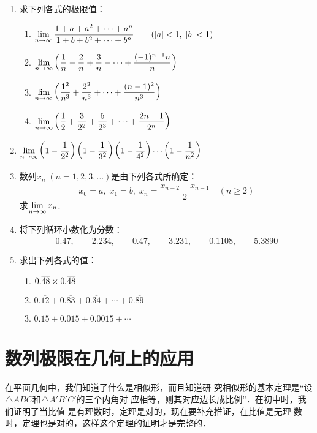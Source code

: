 \begin{enumerate}
\item 求下列各式的极限值：
\begin{enumerate}
    \item  $\displaystyle\lim _{n\to  \infty} \dfrac{1+a+a^{2}+\cdots+a^{n}}{1+b+b^{2}+\cdots+b^{n}} \qquad(|a|<1,\;|b|<1)$
    \item  $\displaystyle\lim _{n\to  \infty}\left(\dfrac{1}{n}-\dfrac{2}{n}+\dfrac{3}{n}-\cdots+\dfrac{(-1)^{n-1} n}{n}\right)$
    \item $\displaystyle\lim _{n\to  \infty}\left(\dfrac{1^{2}}{n^{3}}+\dfrac{2^{2}}{n^{3}}+\cdots+\dfrac{(n-1)^{2}}{n^{3}}\right)$
    \item $\displaystyle\lim _{n\to  \infty}\left(\dfrac{1}{2}+\dfrac{3}{{2^2}}+\dfrac{5}{2^3}+\cdots+\dfrac{2n-1}{2^{n}}\right)$
\end{enumerate}

\item $\displaystyle\lim _{n\to  \infty}\left(1-\dfrac{1}{2^2}\right)\left(1-\dfrac{1}{3^2}\right)\left(1-\dfrac{1}{4^2}\right)\cdots\left(1-\dfrac{1}{n^2}\right)$

\item 数列$x_n\; (n=1,2,3,\ldots)$是由下列各式所确定：
\[x_0=a,\; x_1=b,\; x_n=\frac{x_{n-2}+x_{n-1}}{2}\quad (n\ge 2)\]
求$\displaystyle\lim_{n\to\infty}x_n$.

\item 将下列循环小数化为分数：
\[0.\overline{47},\qquad 2.\overline{234},\qquad 0.4\overline{7},\qquad 3.2\overline{31},\qquad 0.\overline{1108},\qquad 5.38\overline{90}\]
\item 求出下列各式的值：
\begin{enumerate}
    \item $0.\overline{48}\times0.\overline{48}$
    \item $0.\overline{12}+0.\overline{83}+0.\overline{34}+\cdots+0.\overline{89}$
    \item $0.\overline{15}+0.0\overline{15}+0.00\overline{15}+\cdots$
\end{enumerate}
\end{enumerate}

\section{数列极限在几何上的应用}
在平面几何中，我们知道了什么是相似形，而且知道研
究相似形的基本定理是“设$\triangle ABC$和$\triangle A'B'C'$的三个内角对
应相等，则其对应边长成比例”．在初中时，我们证明了当比值
是有理数时，定理是对的，现在要补充推证，在比值是无理
数时，定理也是对的，这样这个定理的证明才是完整的．

